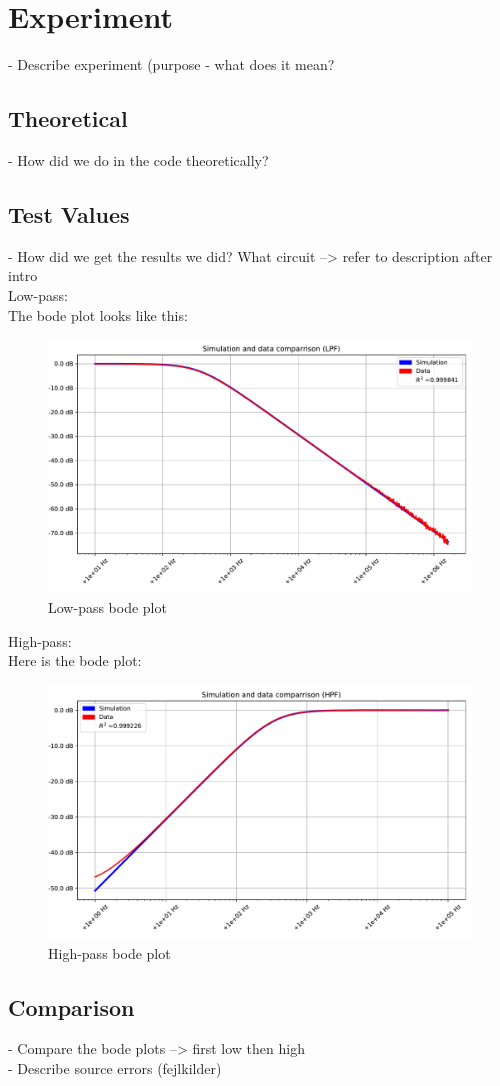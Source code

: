 \section{Experiment}
- Describe experiment (purpose - what does it mean?
\subsection{Theoretical}
- How did we do in the code theoretically?
\subsection{Test Values}
- How did we get the results we did? What circuit --> refer to description after intro \\
Low-pass: \\
The bode plot looks like this:
\begin{figure}[H]
\center
	\includegraphics[scale=0.5]{fig/img/bode_LPF_plot.pdf}
	\caption{Low-pass bode plot}
	\label{lp:bode}
\end{figure}
High-pass: \\
Here is the bode plot:
\begin{figure}[H]
\center
	\includegraphics[scale=0.5]{fig/img/bode_HPF_plot.pdf}
	\caption{High-pass bode plot}
	\label{hp:bode}
\end{figure}
\subsection{Comparison}
- Compare the bode plots --> first low then high \\
- Describe source errors (fejlkilder) 